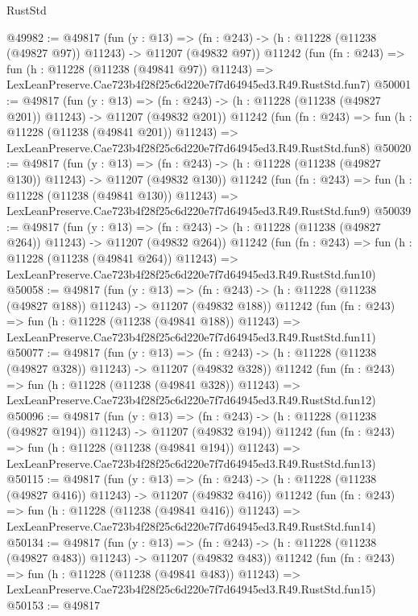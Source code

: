 \begin{lexlean}{RustStd}
\begin{coremodule}
@49982 := @49817
    (fun (y : @13) =>
    (fn : @243) -> (h : @11228 (@11238 (@49827 @97)) @11243) -> @11207 (@49832 @97))
    @11242
    (fun (fn : @243) =>
    fun (h : @11228 (@11238 (@49841 @97)) @11243) =>
    LexLeanPreserve.Cae723b4f28f25c6d220e7f7d64945ed3.R49.RustStd.fun7)
@50001 := @49817
    (fun (y : @13) =>
    (fn : @243) -> (h : @11228 (@11238 (@49827 @201)) @11243) -> @11207 (@49832 @201))
    @11242
    (fun (fn : @243) =>
    fun (h : @11228 (@11238 (@49841 @201)) @11243) =>
    LexLeanPreserve.Cae723b4f28f25c6d220e7f7d64945ed3.R49.RustStd.fun8)
@50020 := @49817
    (fun (y : @13) =>
    (fn : @243) -> (h : @11228 (@11238 (@49827 @130)) @11243) -> @11207 (@49832 @130))
    @11242
    (fun (fn : @243) =>
    fun (h : @11228 (@11238 (@49841 @130)) @11243) =>
    LexLeanPreserve.Cae723b4f28f25c6d220e7f7d64945ed3.R49.RustStd.fun9)
@50039 := @49817
    (fun (y : @13) =>
    (fn : @243) -> (h : @11228 (@11238 (@49827 @264)) @11243) -> @11207 (@49832 @264))
    @11242
    (fun (fn : @243) =>
    fun (h : @11228 (@11238 (@49841 @264)) @11243) =>
    LexLeanPreserve.Cae723b4f28f25c6d220e7f7d64945ed3.R49.RustStd.fun10)
@50058 := @49817
    (fun (y : @13) =>
    (fn : @243) -> (h : @11228 (@11238 (@49827 @188)) @11243) -> @11207 (@49832 @188))
    @11242
    (fun (fn : @243) =>
    fun (h : @11228 (@11238 (@49841 @188)) @11243) =>
    LexLeanPreserve.Cae723b4f28f25c6d220e7f7d64945ed3.R49.RustStd.fun11)
@50077 := @49817
    (fun (y : @13) =>
    (fn : @243) -> (h : @11228 (@11238 (@49827 @328)) @11243) -> @11207 (@49832 @328))
    @11242
    (fun (fn : @243) =>
    fun (h : @11228 (@11238 (@49841 @328)) @11243) =>
    LexLeanPreserve.Cae723b4f28f25c6d220e7f7d64945ed3.R49.RustStd.fun12)
@50096 := @49817
    (fun (y : @13) =>
    (fn : @243) -> (h : @11228 (@11238 (@49827 @194)) @11243) -> @11207 (@49832 @194))
    @11242
    (fun (fn : @243) =>
    fun (h : @11228 (@11238 (@49841 @194)) @11243) =>
    LexLeanPreserve.Cae723b4f28f25c6d220e7f7d64945ed3.R49.RustStd.fun13)
@50115 := @49817
    (fun (y : @13) =>
    (fn : @243) -> (h : @11228 (@11238 (@49827 @416)) @11243) -> @11207 (@49832 @416))
    @11242
    (fun (fn : @243) =>
    fun (h : @11228 (@11238 (@49841 @416)) @11243) =>
    LexLeanPreserve.Cae723b4f28f25c6d220e7f7d64945ed3.R49.RustStd.fun14)
@50134 := @49817
    (fun (y : @13) =>
    (fn : @243) -> (h : @11228 (@11238 (@49827 @483)) @11243) -> @11207 (@49832 @483))
    @11242
    (fun (fn : @243) =>
    fun (h : @11228 (@11238 (@49841 @483)) @11243) =>
    LexLeanPreserve.Cae723b4f28f25c6d220e7f7d64945ed3.R49.RustStd.fun15)
@50153 := @49817

\end{coremodule}
\end{lexlean}
